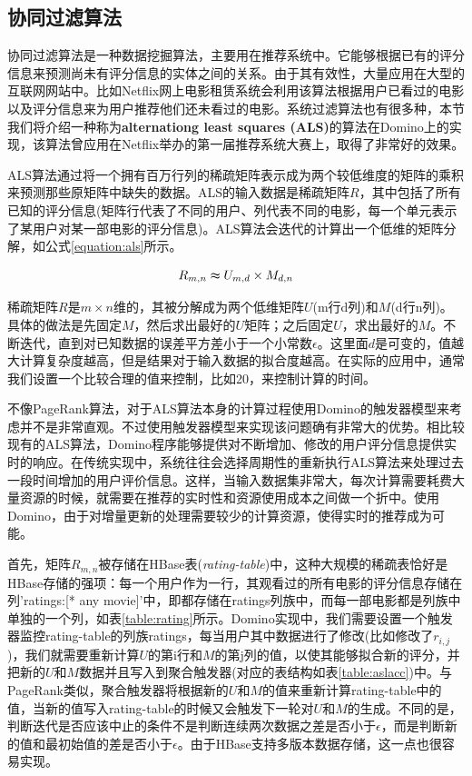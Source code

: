 \subsection{协同过滤算法}
协同过滤算法是一种数据挖掘算法，主要用在推荐系统中。它能够根据已有的评分信息来预测尚未有评分信息的实体之间的关系。由于其有效性，大量应用在大型的互联网网站中。比如Netflix网上电影租赁系统会利用该算法根据用户已看过的电影以及评分信息来为用户推荐他们还未看过的电影。系统过滤算法也有很多种，本节我们将介绍一种称为\textbf{alternationg least squares (ALS)}的算法\cite{zhou2008large}在Domino上的实现，该算法曾应用在Netflix举办的第一届推荐系统大赛上，取得了非常好的效果。

ALS算法通过将一个拥有百万行列的稀疏矩阵表示成为两个较低维度的矩阵的乘积来预测那些原矩阵中缺失的数据。ALS的输入数据是稀疏矩阵$R$，其中包括了所有已知的评分信息(矩阵行代表了不同的用户、列代表不同的电影，每一个单元表示了某用户对某一部电影的评分信息)。ALS算法会迭代的计算出一个低维的矩阵分解，如公式\ref{equation:als}所示。

\begin{equation}
  \label{equation:als}
  R_{m,n} \thickapprox U_{m,d} \times M_{d,n}
\end{equation}

稀疏矩阵$R$是$m \times n$维的，其被分解成为两个低维矩阵$U$(m行d列)和$M$(d行n列)。具体的做法是先固定$M$，然后求出最好的$U$矩阵；之后固定$U$，求出最好的$M$。不断迭代，直到对已知数据的误差平方差小于一个小常数$\epsilon$。这里面$d$是可变的，值越大计算复杂度越高，但是结果对于输入数据的拟合度越高。在实际的应用中，通常我们设置一个比较合理的值来控制，比如20，来控制计算的时间。

不像PageRank算法，对于ALS算法本身的计算过程使用Domino的触发器模型来考虑并不是非常直观。不过使用触发器模型来实现该问题确有非常大的优势。相比较现有的ALS算法，Domino程序能够提供对不断增加、修改的用户评分信息提供实时的响应。在传统实现中，系统往往会选择周期性的重新执行ALS算法来处理过去一段时间增加的用户评价信息。这样，当输入数据集非常大，每次计算需要耗费大量资源的时候，就需要在推荐的实时性和资源使用成本之间做一个折中。使用Domino，由于对增量更新的处理需要较少的计算资源，使得实时的推荐成为可能。

首先，矩阵$R_{m,n}$被存储在HBase表(\textit{rating-table})中，这种大规模的稀疏表恰好是HBase存储的强项：每一个用户作为一行，其观看过的所有电影的评分信息存储在列'ratings:[* any movie]'中，即都存储在ratings列族中，而每一部电影都是列族中单独的一个列，如表\ref{table:rating}所示。Domino实现中，我们需要设置一个触发器监控rating-table的列族ratings，每当用户其中数据进行了修改(比如修改了$r_{i,j}$)，我们就需要重新计算$U$的第i行和$M$的第j列的值，以使其能够拟合新的评分，并把新的$U$和$M$数据并且写入到聚合触发器(对应的表结构如表\ref{table:aslacc})中。与PageRank类似，聚合触发器将根据新的$U$和$M$的值来重新计算rating-table中的值，当新的值写入rating-table的时候又会触发下一轮对$U$和$M$的生成。不同的是，判断迭代是否应该中止的条件不是判断连续两次数据之差是否小于$\epsilon$，而是判断新的值和最初始值的差是否小于$\epsilon$。由于HBase支持多版本数据存储，这一点也很容易实现。

